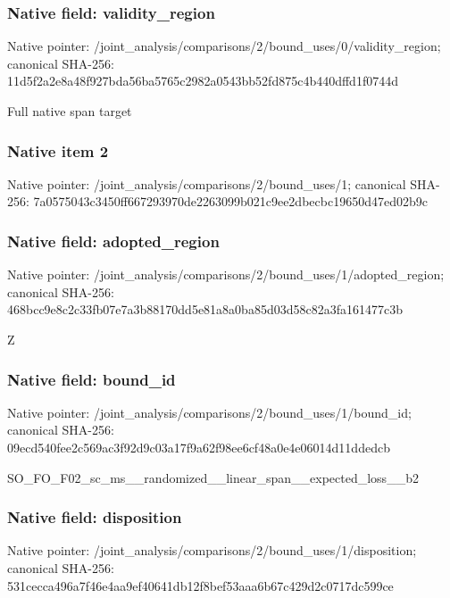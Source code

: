\documentclass[10pt,a4paper]{article}
\begin{document}
\subsubsection{Native field: validity\_\allowbreak{}region}
Native pointer: /joint\_\allowbreak{}analysis/comparisons/2/bound\_\allowbreak{}uses/0/validity\_\allowbreak{}region; canonical SHA-256: 11d5f2a2e8a48f927bda56ba5765c2982a0543bb52fd875c4b440dffd1f0744d

\begingroup\raggedright\sloppy Full native span target\par\endgroup

\subsubsection{Native item 2}
Native pointer: /joint\_\allowbreak{}analysis/comparisons/2/bound\_\allowbreak{}uses/1; canonical SHA-256: 7a0575043c3450ff667293970de2263099b021c9ee2dbecbc19650d47ed02b9c

\subsubsection{Native field: adopted\_\allowbreak{}region}
Native pointer: /joint\_\allowbreak{}analysis/comparisons/2/bound\_\allowbreak{}uses/1/adopted\_\allowbreak{}region; canonical SHA-256: 468bcc9e8c2c33fb07e7a3b88170dd5e81a8a0ba85d03d58c82a3fa161477c3b

\begingroup\raggedright\sloppy Z\par\endgroup

\subsubsection{Native field: bound\_\allowbreak{}id}
Native pointer: /joint\_\allowbreak{}analysis/comparisons/2/bound\_\allowbreak{}uses/1/bound\_\allowbreak{}id; canonical SHA-256: 09ecd540fee2c569ac3f92d9c03a17f9a62f98ee6cf48a0e4e06014d11ddedcb

\begingroup\raggedright\sloppy SO\_\allowbreak{}FO\_\allowbreak{}F02\_\allowbreak{}sc\_\allowbreak{}ms\_\allowbreak{}\_\allowbreak{}randomized\_\allowbreak{}\_\allowbreak{}linear\_\allowbreak{}span\_\allowbreak{}\_\allowbreak{}expected\_\allowbreak{}loss\_\allowbreak{}\_\allowbreak{}b2\par\endgroup

\subsubsection{Native field: disposition}
Native pointer: /joint\_\allowbreak{}analysis/comparisons/2/bound\_\allowbreak{}uses/1/disposition; canonical SHA-256: 531cecca496a7f46e4aa9ef40641db12f8bef53aaa6b67c429d2c0717dc599ce
\end{document}
